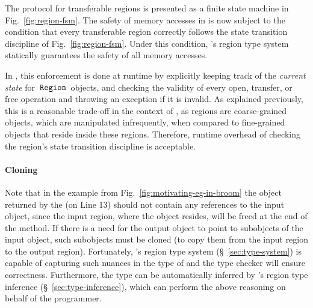 The protocol for transferable regions is presented as a finite state
machine in Fig.~\ref{fig:region-fsm}.  
%
The safety of memory accesses in \name is now subject to the condition
that every transferable region correctly follows the state transition
discipline of Fig.~\ref{fig:region-fsm}. Under this condition, \name's
region type system statically guarantees the safety of all memory
accesses.

In \name, this enforcement is done at runtime by explicitly keeping
track of the \emph{current state} for $\,{\tt Region}\,$ objects, and checking
the validity of every open, transfer, or free operation and throwing
an exception if it is invalid.  
As explained previously, this is a reasonable trade-off in the context
of \name, as regions are coarse-grained objects, which are manipulated
infrequently, when compared to fine-grained objects that reside inside
these regions. Therefore, runtime overhead of checking the region's
state transition discipline is acceptable.



\paragraph{Cloning} Note that in the example from
Fig.~\ref{fig:motivating-eg-in-broom} the object returned by the
 (on Line 13) should not contain any references to the
input object, since the input region, where the object resides, will
be freed at the end of the method. If there is a need for the output
object to point to subobjects of the input object, such subobjects
must be cloned (to copy them from the input region to the output
region).  Fortunately, \name's region type system
(\S~\ref{sec:type-system}) is capable of capturing such nuances in the
type of  and the type checker will ensure correctness.
Furthermore, the type can be automatically inferred by \name's region
type inference (\S~\ref{sec:type-inference}), which can perform the
above reasoning on behalf of the programmer.


